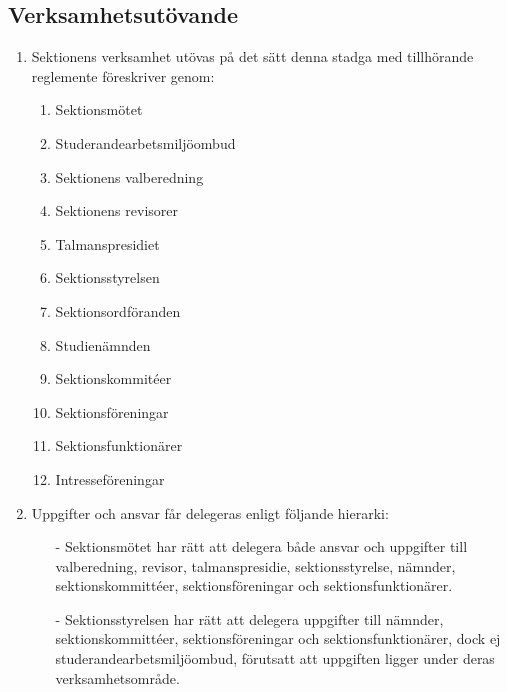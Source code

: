 \documentclass[11pt,a4paper]{article}
\begin{document}
\subsection{Verksamhetsutövande}
\begin{enumerate}[\thesubsection.1]

  \item Sektionens verksamhet ut\-övas på det sätt denna stadga med
   till\-hör\-ande regle\-mente föreskriver genom:
      \begin{enumerate}[1]
       \item Sektionsmötet
       \item Studerandearbetsmiljöombud
       \item Sektionens valberedning
       \item Sektionens revisorer
       \item Talmanspresidiet
       \item Sektionsstyrelsen
	 	 \item Sektionsordföranden
       \item Studienämnden
       \item Sektionskommitéer
       \item Sektionsföreningar
       \item Sektionsfunktionärer
       \item Intresseföreningar
      \end{enumerate}

	\item Uppgifter och ansvar får delegeras enligt följande hierarki:
		\begin{enumerate}
			\item[-] Sektionsmötet har rätt att delegera både ansvar och uppgifter till valberedning, revisor, talmanspresidie, sektionsstyrelse, nämnder, sektionskommittéer, sektionsföreningar och sektionsfunktionärer.
			\item[-] Sektionsstyrelsen har rätt att delegera uppgifter till nämnder,  sektionskommittéer, sektionsföreningar och sektionsfunktionärer, dock ej studerandearbetsmiljöombud, förutsatt att uppgiften ligger under deras verksamhetsområde.
		\end{enumerate}

\end{enumerate}
\end{document}
